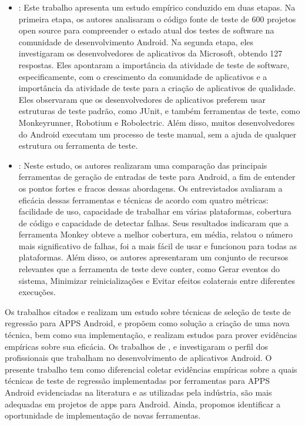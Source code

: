 \begin{itemize}
    \item \cite{7102609}: Este trabalho apresenta um estudo empírico conduzido em duas etapas. Na primeira etapa, os autores analisaram o código fonte de teste de 600 projetos open source para compreender o estado atual dos testes de software na comunidade de desenvolvimento Android. Na segunda etapa, eles investigaram os desenvolvedores de aplicativos da Microsoft, obtendo 127 respostas. Eles apontaram a importância da atividade de teste de software, especificamente, com o crescimento da comunidade de aplicativos e a importância da atividade de teste para a criação de aplicativos de qualidade. Eles observaram que os desenvolvedores de aplicativos preferem usar estruturas de teste padrão, como JUnit, e também ferramentas de teste, como Monkeyrunner, Robotium e Robolectric. Além disso, muitos desenvolvedores do Android executam um processo de teste manual, sem a ajuda de qualquer estrutura ou ferramenta de teste.
    
    
    \item \cite{ROY:2015}: Neste estudo, os autores realizaram uma comparação das principais ferramentas de geração de entradas de teste para Android, a fim de entender os pontos fortes e fracos dessas abordagens. Os entrevistados avaliaram a eficácia dessas ferramentas e técnicas de acordo com quatro métricas: facilidade de uso, capacidade de trabalhar em várias plataformas, cobertura de código e capacidade de detectar falhas. Seus resultados indicaram que a ferramenta Monkey obteve a melhor cobertura, em média, relatou o número mais significativo de falhas, foi a mais fácil de usar e funcionou para todas as plataformas. Além disso, os autores apresentaram um conjunto de recursos relevantes que a ferramenta de teste deve conter, como Gerar eventos do sistema, Minimizar reinicializações e Evitar efeitos colaterais entre diferentes execuções.
    
\end{itemize}
    
    Os trabalhos citados \cite{8377661} e \cite{Do2016RedroidAR} realizam um estudo sobre técnicas de seleção de teste de regressão para \ac{APPS} Android, e propõem como solução a criação de uma nova técnica, bem como sua implementação, e realizam estudos para prover evidências empíricas sobre sua eficácia. Os trabalhos de \cite{8094467}, \cite{7102609} e \cite{ROY:2015} investigaram o perfil dos profissionais que trabalham no desenvolvimento de aplicativos Android.  O presente trabalho tem como diferencial coletar evidências empíricas sobre a quais técnicas de teste de regressão implementadas por ferramentas para \ac{APPS} Android evidenciadas na literatura e as utilizadas pela indústria, são mais adequadas em projetos de apps para Android. Ainda, propomos identificar a oportunidade de implementação de novas ferramentas.


